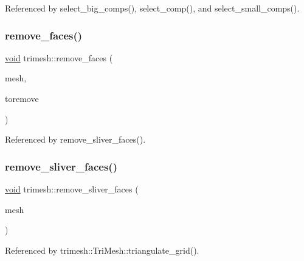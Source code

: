 Referenced by select\+\_\+big\+\_\+comps(), select\+\_\+comp(), and select\+\_\+small\+\_\+comps().

\mbox{\label{namespacetrimesh_ad247ad89293bd31564b04db8a913de23}} 
\subsubsection{\texorpdfstring{remove\+\_\+faces()}{remove\_faces()}\hspace{0.1cm}{\footnotesize\ttfamily [2/2]}}
{\footnotesize\ttfamily \hyperlink{namespacetrimesh_a784ddfd979e1c579bda795a8edfc3f43}{void} trimesh\+::remove\+\_\+faces (\begin{DoxyParamCaption}\item[{\hyperlink{classtrimesh_1_1TriMesh}{Tri\+Mesh} $\ast$}]{mesh,  }\item[{const vector$<$ bool $>$ \&}]{toremove }\end{DoxyParamCaption})}



Referenced by remove\+\_\+sliver\+\_\+faces().

\mbox{\label{namespacetrimesh_afe82003e1666436750d8920cc5f8aa1c}} 
\subsubsection{\texorpdfstring{remove\+\_\+sliver\+\_\+faces()}{remove\_sliver\_faces()}}
{\footnotesize\ttfamily \hyperlink{namespacetrimesh_a784ddfd979e1c579bda795a8edfc3f43}{void} trimesh\+::remove\+\_\+sliver\+\_\+faces (\begin{DoxyParamCaption}\item[{\hyperlink{classtrimesh_1_1TriMesh}{Tri\+Mesh} $\ast$}]{mesh }\end{DoxyParamCaption})}



Referenced by trimesh\+::\+Tri\+Mesh\+::triangulate\+\_\+grid().

\mbox{\label{namespacetrimesh_a0930a3eeaa4d0e80fbccb6b1baf71525}} 
